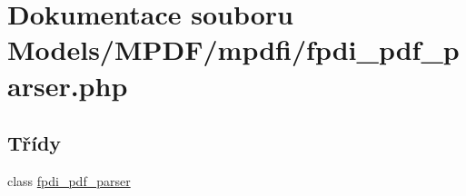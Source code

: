 \hypertarget{fpdi__pdf__parser_8php}{\section{Dokumentace souboru Models/\-M\-P\-D\-F/mpdfi/fpdi\-\_\-pdf\-\_\-parser.php}
\label{fpdi__pdf__parser_8php}
}
\subsection*{Třídy}
\begin{DoxyCompactItemize}
\item 
class \hyperlink{classfpdi__pdf__parser}{fpdi\-\_\-pdf\-\_\-parser}
\end{DoxyCompactItemize}
